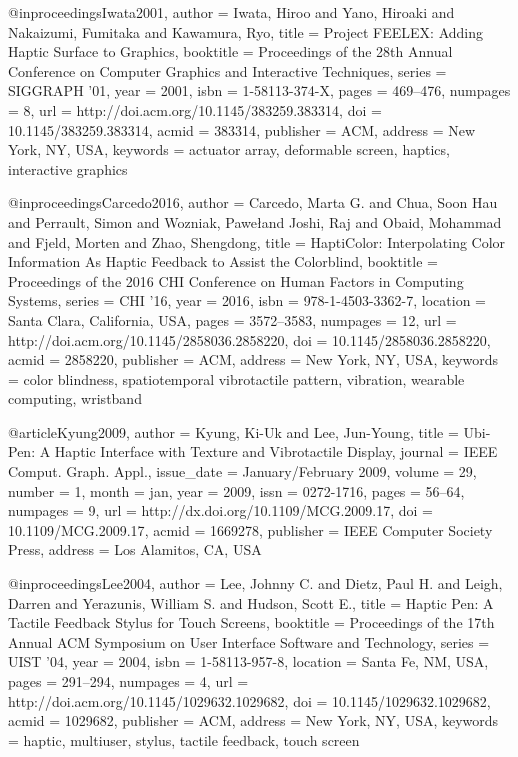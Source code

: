 @inproceedings{Iwata2001,
 author = {Iwata, Hiroo and Yano, Hiroaki and Nakaizumi, Fumitaka and Kawamura, Ryo},
 title = {{Project FEELEX: Adding Haptic Surface to Graphics}},
 booktitle = {Proceedings of the 28th Annual Conference on Computer Graphics and Interactive Techniques},
 series = {SIGGRAPH '01},
 year = {2001},
 isbn = {1-58113-374-X},
 pages = {469--476},
 numpages = {8},
 url = {http://doi.acm.org/10.1145/383259.383314},
 doi = {10.1145/383259.383314},
 acmid = {383314},
 publisher = {ACM},
 address = {New York, NY, USA},
 keywords = {actuator array, deformable screen, haptics, interactive graphics}
} 

@inproceedings{Carcedo2016,
 author = {Carcedo, Marta G. and Chua, Soon Hau and Perrault, Simon and Wozniak, Pawe\l and Joshi, Raj and Obaid, Mohammad and Fjeld, Morten and Zhao, Shengdong},
 title = {{HaptiColor: Interpolating Color Information As Haptic Feedback to Assist the Colorblind}},
 booktitle = {Proceedings of the 2016 CHI Conference on Human Factors in Computing Systems},
 series = {CHI '16},
 year = {2016},
 isbn = {978-1-4503-3362-7},
 location = {Santa Clara, California, USA},
 pages = {3572--3583},
 numpages = {12},
 url = {http://doi.acm.org/10.1145/2858036.2858220},
 doi = {10.1145/2858036.2858220},
 acmid = {2858220},
 publisher = {ACM},
 address = {New York, NY, USA},
 keywords = {color blindness, spatiotemporal vibrotactile pattern, vibration, wearable computing, wristband}
} 

@article{Kyung2009,
 author = {Kyung, Ki-Uk and Lee, Jun-Young},
 title = {{Ubi-Pen: A Haptic Interface with Texture and Vibrotactile Display}},
 journal = {IEEE Comput. Graph. Appl.},
 issue_date = {January/February 2009},
 volume = {29},
 number = {1},
 month = jan,
 year = {2009},
 issn = {0272-1716},
 pages = {56--64},
 numpages = {9},
 url = {http://dx.doi.org/10.1109/MCG.2009.17},
 doi = {10.1109/MCG.2009.17},
 acmid = {1669278},
 publisher = {IEEE Computer Society Press},
 address = {Los Alamitos, CA, USA}
} 

@inproceedings{Lee2004,
 author = {Lee, Johnny C. and Dietz, Paul H. and Leigh, Darren and Yerazunis, William S. and Hudson, Scott E.},
 title = {{Haptic Pen: A Tactile Feedback Stylus for Touch Screens}},
 booktitle = {Proceedings of the 17th Annual ACM Symposium on User Interface Software and Technology},
 series = {UIST '04},
 year = {2004},
 isbn = {1-58113-957-8},
 location = {Santa Fe, NM, USA},
 pages = {291--294},
 numpages = {4},
 url = {http://doi.acm.org/10.1145/1029632.1029682},
 doi = {10.1145/1029632.1029682},
 acmid = {1029682},
 publisher = {ACM},
 address = {New York, NY, USA},
 keywords = {haptic, multiuser, stylus, tactile feedback, touch screen}
} 

